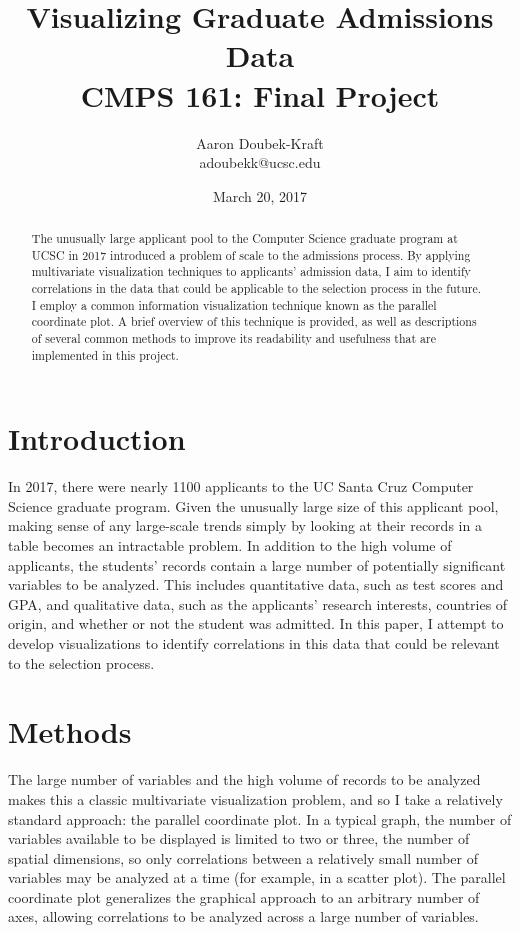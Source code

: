 \documentclass[]{article}
\title{Visualizing Graduate Admissions Data \\ CMPS 161: Final Project}
\author{Aaron Doubek-Kraft \\ adoubekk@ucsc.edu}
\date{March 20, 2017}
\begin{document}
	
\begin{titlepage}

	\maketitle

	\begin{abstract}
		The unusually large applicant pool to the Computer Science graduate program at UCSC in 2017 introduced a problem of scale to the admissions process. By applying multivariate visualization techniques to applicants' admission data, I aim to identify correlations in the data that could be applicable to the selection process in the future. I employ a common information visualization technique known as the parallel coordinate plot. A brief overview of this technique is provided, as well as descriptions of several common methods to improve its readability and usefulness that are implemented in this project.
	\end{abstract}

\end{titlepage}

\section{Introduction}

	\par In 2017, there were nearly 1100 applicants to the UC Santa Cruz Computer Science graduate program. Given the unusually large size of this applicant pool, making sense of any large-scale trends simply by looking at their records in a table becomes an intractable problem. In addition to the high volume of applicants, the students' records contain a large number of potentially significant variables to be analyzed. This includes quantitative data, such as test scores and GPA, and qualitative data, such as the applicants' research interests, countries of origin, and whether or not the student was admitted.  In this paper, I attempt to develop visualizations to identify correlations in this data that could be relevant to the selection process. 

\section{Methods}

	The large number of variables and the high volume of records to be analyzed makes this a classic multivariate visualization problem, and so I take a relatively standard approach: the parallel coordinate plot. In a typical graph, the number of variables available to be displayed is limited to two or three, the number of spatial dimensions, so only correlations between a relatively small number of variables may be analyzed at a time (for example, in a scatter plot). The parallel coordinate plot generalizes the graphical approach to an arbitrary number of axes, allowing correlations to be analyzed across a large number of variables.
\end{document}

